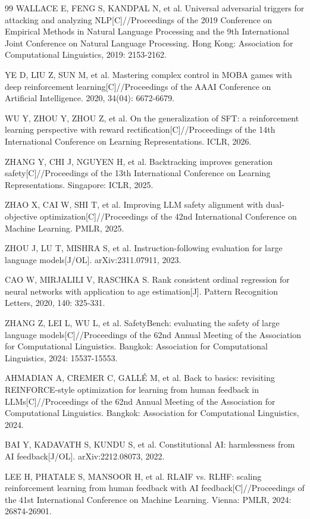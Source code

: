 \documentclass[fontset=fandol,type=master,campus=shenzhen,etitleauto=true]{hithesisbook}
\begin{document}
\begin{thebibliography}{99}
 WALLACE E, FENG S, KANDPAL N, et al. Universal adversarial triggers for attacking and analyzing NLP[C]//Proceedings of the 2019 Conference on Empirical Methods in Natural Language Processing and the 9th International Joint Conference on Natural Language Processing. Hong Kong: Association for Computational Linguistics, 2019: 2153-2162.

 YE D, LIU Z, SUN M, et al. Mastering complex control in MOBA games with deep reinforcement learning[C]//Proceedings of the AAAI Conference on Artificial Intelligence. 2020, 34(04): 6672-6679.

 WU Y, ZHOU Y, ZHOU Z, et al. On the generalization of SFT: a reinforcement learning perspective with reward rectification[C]//Proceedings of the 14th International Conference on Learning Representations. ICLR, 2026.

 ZHANG Y, CHI J, NGUYEN H, et al. Backtracking improves generation safety[C]//Proceedings of the 13th International Conference on Learning Representations. Singapore: ICLR, 2025.

 ZHAO X, CAI W, SHI T, et al. Improving LLM safety alignment with dual-objective optimization[C]//Proceedings of the 42nd International Conference on Machine Learning. PMLR, 2025.

 ZHOU J, LU T, MISHRA S, et al. Instruction-following evaluation for large language models[J/OL]. arXiv:2311.07911, 2023.

 CAO W, MIRJALILI V, RASCHKA S. Rank consistent ordinal regression for neural networks with application to age estimation[J]. Pattern Recognition Letters, 2020, 140: 325-331.

 ZHANG Z, LEI L, WU L, et al. SafetyBench: evaluating the safety of large language models[C]//Proceedings of the 62nd Annual Meeting of the Association for Computational Linguistics. Bangkok: Association for Computational Linguistics, 2024: 15537-15553.

 AHMADIAN A, CREMER C, GALL\'E M, et al. Back to basics: revisiting REINFORCE-style optimization for learning from human feedback in LLMs[C]//Proceedings of the 62nd Annual Meeting of the Association for Computational Linguistics. Bangkok: Association for Computational Linguistics, 2024.

 BAI Y, KADAVATH S, KUNDU S, et al. Constitutional AI: harmlessness from AI feedback[J/OL]. arXiv:2212.08073, 2022.

 LEE H, PHATALE S, MANSOOR H, et al. RLAIF vs. RLHF: scaling reinforcement learning from human feedback with AI feedback[C]//Proceedings of the 41st International Conference on Machine Learning. Vienna: PMLR, 2024: 26874-26901.

\end{thebibliography}
\end{document}
